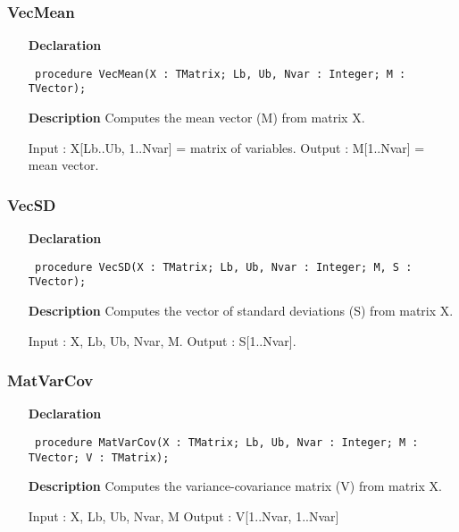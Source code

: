 \documentclass[12pt,a4paper,oneside]{report}
\newcommand{\declarationitem}[1]{\textbf{#1}}
\newcommand{\descriptiontitle}[1]{\textbf{#1}}
\newcommand{\code}[1]{\texttt{#1}}
\begin{document}
\subsubsection{VecMean}
\label{upca-VecMean}
\begin{itemize}\item[\declarationitem{Declaration}\hfill]
	\begin{flushleft}
		\code{
			procedure VecMean(X : TMatrix; Lb, Ub, Nvar : Integer; M : TVector);}
	\end{flushleft}
	\par
	\item[\descriptiontitle{Description}]
	Computes the mean vector (M) from matrix X.
	
	Input : X[Lb..Ub, 1..Nvar] = matrix of variables. Output : M[1..Nvar] = mean vector.
\end{itemize}
\subsubsection{VecSD}
\label{upca-VecSD}
\begin{itemize}\item[\declarationitem{Declaration}\hfill]
	\begin{flushleft}
		\code{
			procedure VecSD(X : TMatrix; Lb, Ub, Nvar : Integer; M, S : TVector);}
	\end{flushleft}
	\item[\descriptiontitle{Description}]
	Computes the vector of standard deviations (S) from matrix X.
	
	Input : X, Lb, Ub, Nvar, M. Output : S[1..Nvar].
	
\end{itemize}
\subsubsection{MatVarCov}
\label{upca-MatVarCov}
\begin{itemize}\item[\declarationitem{Declaration}\hfill]
	\begin{flushleft}
		\code{
			procedure MatVarCov(X : TMatrix; Lb, Ub, Nvar : Integer; M : TVector; V : TMatrix);}
	\end{flushleft}
	\item[\descriptiontitle{Description}]
	Computes the variance{-}covariance matrix (V) from matrix X.
	
	Input : X, Lb, Ub, Nvar, M Output : V[1..Nvar, 1..Nvar]
\end{itemize}
\end{document}
